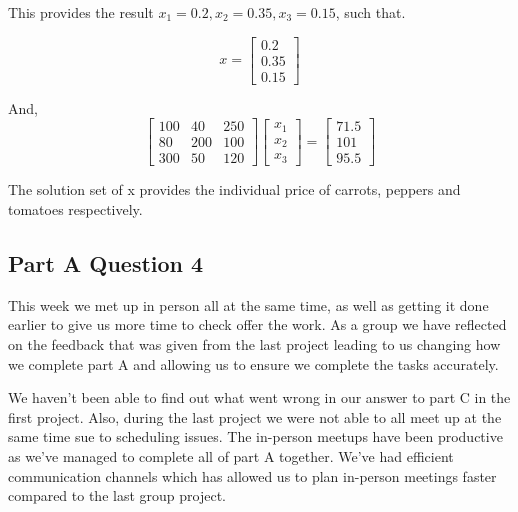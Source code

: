 \documentclass{article}
\begin{document}
This provides the result $x_1 = 0.2, x_2 = 0.35, x_3 = 0.15$, such that.

\begin{equation*}
    x =
    \begin{bmatrix}
        0.2 \\0.35 \\0.15
    \end{bmatrix}
\end{equation*}

And,
\begin{equation*}
     \begin{bmatrix}
         100 & 40 & 250 \\ 80 & 200 & 100 \\ 300 & 50 & 120
     \end{bmatrix}
     \begin{bmatrix}
         x_1 \\ x_2 \\ x_3
     \end{bmatrix}
     =
     \begin{bmatrix}
         71.5 \\ 101 \\ 95.5
     \end{bmatrix}
\end{equation*}

The solution set of x provides the individual price of carrots, peppers and tomatoes respectively.





\subsection*{Part A Question 4}
This week we met up in person all at the same time, as well as getting it done earlier to give us more time to check offer the work.
As a group we have reflected on the feedback that was given from the last project leading to us changing how we complete part A and allowing us to ensure we complete the tasks accurately.

We haven't been able to find out what went wrong in our answer to part C in the first project. Also, during the last project we were not able to all meet up at the same time sue to scheduling issues.
The in-person meetups have been productive as we've managed to complete all of part A together.
We've had efficient communication channels which has allowed us to plan in-person meetings faster compared to the last group project.
\end{document}
